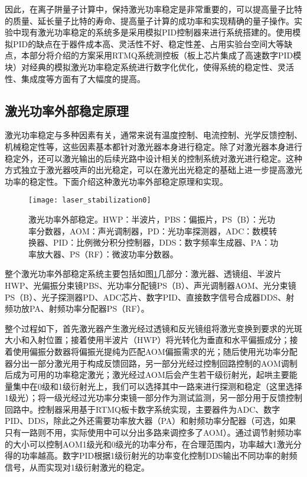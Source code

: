 因此，在离子阱量子计算中，保持激光功率稳定是非常重要的，可以提高量子比特的质量、延长量子比特的寿命、提高量子计算的成功率和实现精确的量子操作。实验中现有激光功率稳定的系统多是采用模拟PID控制器来进行系统搭建的。使用模拟PID的缺点在于器件成本高、灵活性不好、稳定性差、占用实验台空间大等缺点，本部分将介绍的方案采用RTMQ系统测控板（板上芯片集成了高速数字PID模块）对经典的模拟激光功率稳定系统进行数字化优化，使得系统的稳定性、灵活性、集成度等方面有了大幅度的提高。



\subsection[激光功率外部稳定原理]{激光功率外部稳定原理}
激光功率稳定与多种因素有关，通常来说有温度控制、电流控制、光学反馈控制、机械稳定性等，这些因素基本都针对激光器本身进行稳定。除了对激光器本身进行稳定外，还可以激光输出的后续光路中设计相关的控制系统对激光进行稳定。这种方式独立于激光器吱声的出光稳定，可以在激光出光稳定的基础上进一步提高激光功率的稳定性。下面介绍这种激光功率外部稳定原理和实现。

\begin{figure}
    \centering
    \caption[激光功率外部稳定]{激光功率外部稳定。HWP：半波片，PBS：偏振片，PS（B）：光功率分数器，AOM：声光调制器，PD：光功率探测器，ADC：数模转换器、PID：比例微分积分控制器，DDS：数字频率生成器、PA：功率放大器、PS（RF）：微波功率分数器。\label{fig:laser_stabilization0}}
    \texttt{[image: laser\_stabilization0]}
\end{figure}

整个激光功率外部稳定系统主要包括如图\ref{fig:laser_stabilization0}几部分：激光器、透镜组、半波片HWP、光偏振分束镜PBS、光功率分配镜PS（B）、声光调制器AOM、光分束镜PS（B）、光子探测器PD、ADC芯片、数字PID、直接数字信号合成器DDS、射频功放PA、射频功率分配器PS（RF）。

整个过程如下，首先激光器产生激光经过透镜和反光镜组将激光变换到要求的光斑大小和入射位置；接着使用半波片（HWP）将光转化为垂直和水平偏振成分；接着使用偏振分数器将偏振光提纯为匹配AOM偏振需求的光；随后使用光功率分配器分出一部分激光用于构成反馈回路，另一部分光经过控制回路控制的AOM调制后成为可用的功率稳定激光；激光经过AOM后会产生若干级衍射光，起哄主要能量集中在0级和1级衍射光上，我们可以选择其中一路来进行探测和稳定（这里选择1级光）；将一级光经过光功率分束镜一部分作为测试监测，另一部分用于反馈控制回路中。控制器采用基于RTMQ板卡数字系统实现，主要器件为ADC、数字PID、DDS，除此之外还需要功率放大器（PA）和射频功率分配器（可选，如果只有一路则不用，实际使用中可以分出多路来调控多了AOM）。通过调节射频功率的大小可以控制AOM1级光和0级光的功率分布，在合理范围内，功率越大1激光分得的功率越高。数字PID根据1级衍射光的功率变化控制DDS输出不同功率的射频信号，从而实现对1级衍射激光的稳定。

